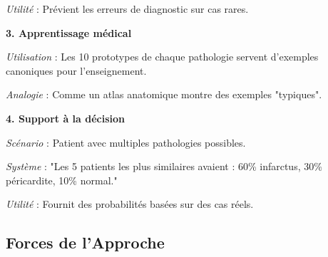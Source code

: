 \documentclass[12pt,a4paper]{article}
\begin{document}
\textit{Utilité} : Prévient les erreurs de diagnostic sur cas rares.

\textbf{3. Apprentissage médical}

\textit{Utilisation} : Les 10 prototypes de chaque pathologie servent d'exemples canoniques pour l'enseignement.

\textit{Analogie} : Comme un atlas anatomique montre des exemples "typiques".

\textbf{4. Support à la décision}

\textit{Scénario} : Patient avec multiples pathologies possibles.

\textit{Système} : "Les 5 patients les plus similaires avaient : 60\% infarctus, 30\% péricardite, 10\% normal."

\textit{Utilité} : Fournit des probabilités basées sur des cas réels.

\subsection{Forces de l'Approche}
\end{document}
